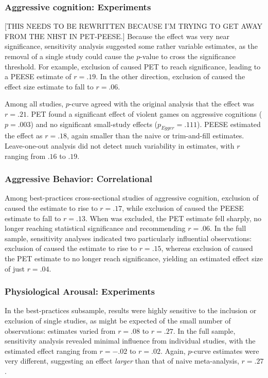 \documentclass[man]{apa6}
\begin{document}
\subsubsection{Aggressive cognition: Experiments}[THIS NEEDS TO BE REWRITTEN BECAUSE I'M TRYING TO GET AWAY FROM THE NHST IN PET-PEESE.] Because the effect was very near significance, sensitivity analysis suggested some rather variable estimates, as the removal of a single study could cause the $p$-value to cross the significance threshold. For example, exclusion of \citet{Bushman:Anderson:2009} caused PET to reach significance, leading to a PEESE estimate of $r = .19$. In the other direction, exclusion of \citet{Anderson:Dill:2000} caused the effect size estimate to fall to $r = .06$.

Among all studies, $p$-curve agreed with the original analysis that the effect was $r = .21$. PET found a significant effect of violent games on aggressive cognitions ($p = .003$) and no significant small-study effects ($p_{Egger} = .111$). PEESE estimated the effect as $r = .18$, again smaller than the naive or trim-and-fill estimates. Leave-one-out analysis did not detect much variability in estimates, with $r$ ranging from $.16$ to $.19$. 

\subsubsection{Aggressive Behavior: Correlational}Among best-practices cross-sectional studies of aggressive cognition, exclusion of \citet{Yukawa:Sakamoto:2001} caused the estimate to rise to $r = .17$, while exclusion of \citet{Funk:etal:2003} caused the PEESE estimate to fall to $r = .13$. When \citet{Anderson:etal:2004} was excluded, the PET estimate fell sharply, no longer reaching statistical significance and recommending $r = .06$. In the full sample, sensitivity analyses indicated two particularly influential observations: exclusion of \citet{Santisteban:etal:2007} caused the estimate to rise to $r = .15$, whereas exclusion of \citet{Funk:etal:2003} caused the PET estimate to no longer reach significance, yielding an estimated effect size of just $r = .04$.

\subsubsection{Physiological Arousal: Experiments}In the best-practices subsample, results were highly sensitive to the inclusion or exclusion of single studies, as might be expected of the small number of observations: estimates varied from $r = .08$ to $r = .27$. In the full sample, sensitivity analysis revealed minimal influence from individual studies, with the estimated effect ranging from $r = -.02$ to $r = .02$. Again, $p$-curve estimates were very different, suggesting an effect {\em larger} than that of naive meta-analysis, $r = .27$.
\end{document}
